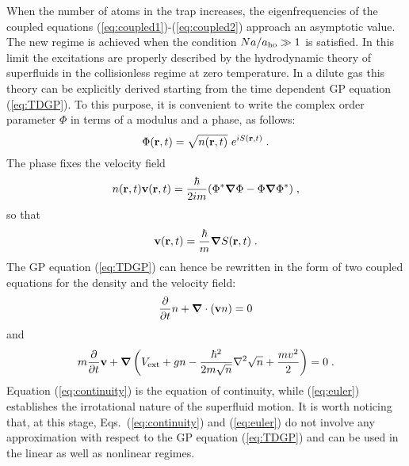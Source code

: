 When the number of atoms in the trap increases, the eigenfrequencies
of the coupled equations (\ref{eq:coupled1})-(\ref{eq:coupled2}) approach
an asymptotic value. The new regime is achieved when the condition
$Na/a_{\rm ho} \gg 1$ is satisfied.  In this limit the excitations are
properly described by the hydrodynamic theory of superfluids in the
collisionless regime at zero temperature. 
In a dilute gas this theory can be explicitly  
derived starting from the time dependent GP equation (\ref{eq:TDGP}). 
To this purpose, it is convenient to write the complex order parameter 
$\Phi$ in terms of a modulus and a phase,
as follows:
\begin{equation}
\Phi ({\bf r},t) = \sqrt{n({\bf r},t) }\ e^{i S ({\bf r},t)} \; .
\label{eq:orderparameter}
\end{equation}
The phase fixes the velocity field
\begin{equation}
n({\bf r},t) {\bf v} ({\bf r},t) =  { \hbar \over 2 i m  }  (\Phi^*
\mbox{\boldmath$\nabla$} \Phi -\Phi \mbox{\boldmath$\nabla$} \Phi^*)
\; ,
\label{eq:velocity}
\end{equation}
so that 
\begin{equation}
{\bf v} ({\bf r},t) = { \hbar \over  m }  
\mbox{\boldmath$\nabla$}  S ({\bf r},t) \; . 
\label{eq:gradientS}
\end{equation}
The GP equation (\ref{eq:TDGP}) can hence be  rewritten in the form of
two coupled equations for the density  and the velocity field:
\begin{equation}
{ \partial \over \partial t} n + \mbox{\boldmath$\nabla$}
\cdot ({\bf v}n) = 0
\label{eq:continuity}
\end{equation}
and
\begin{equation}
m  { \partial \over \partial t} {\bf v} +
\mbox{\boldmath$\nabla$} \left( V_{\rm ext} + g n - 
{\hbar^2 \over 2m \sqrt{n} }
\nabla^2 \sqrt{n}
+ { mv^2 \over 2 } \right) = 0 \; .
\label{eq:euler}
\end{equation}
Equation (\ref{eq:continuity}) is the equation of continuity, while
(\ref{eq:euler}) establishes the irrotational nature of the superfluid
motion. It is worth noticing that, at this stage, 
Eqs.~(\ref{eq:continuity}) and (\ref{eq:euler}) do not
involve any approximation with respect to the GP equation (\ref{eq:TDGP})
and can be used in the linear as well as nonlinear regimes.

